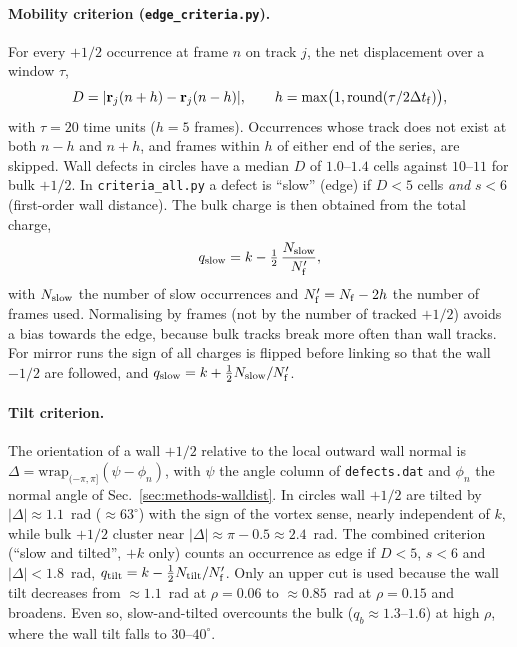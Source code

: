 \paragraph{Mobility criterion (\texttt{edge\_criteria.py}).}
For every $+1/2$ occurrence at frame $n$ on track $j$, the net displacement over a window $\tau$,
\begin{equation}
  D = |\mathbf{r}_j(n+h)-\mathbf{r}_j(n-h)|,\qquad h=\max\!\big(1,\mathrm{round}(\tau/2\Delta t_{\rm f})\big),
\end{equation}
with $\tau=20$ time units ($h=5$ frames). Occurrences whose track does not exist at both $n-h$ and $n+h$,
and frames within $h$ of either end of the series, are skipped. Wall defects in circles have a median
$D$ of $1.0$--$1.4$ cells against $10$--$11$ for bulk $+1/2$.
In \texttt{criteria\_all.py} a defect is ``slow'' (edge) if $D<5$ cells \emph{and} $s<6$ (first-order
wall distance). The bulk charge is then obtained from the total charge,
\begin{equation}
  q_{\rm slow} = k - \tfrac12\,\frac{N_{\rm slow}}{N_{\rm f}'},
\end{equation}
with $N_{\rm slow}$ the number of slow occurrences and $N_{\rm f}'=N_{\rm f}-2h$ the number of frames
used. Normalising by frames (not by the number of tracked $+1/2$) avoids a bias towards the edge,
because bulk tracks break more often than wall tracks.
For mirror runs the sign of all charges is flipped before linking so that the wall $-1/2$ are followed,
and $q_{\rm slow}=k+\tfrac12 N_{\rm slow}/N_{\rm f}'$.

\paragraph{Tilt criterion.}
The orientation of a wall $+1/2$ relative to the local outward wall normal is
$\Delta=\mathrm{wrap}_{(-\pi,\pi]}(\psi-\phi_n)$, with $\psi$ the angle column of \texttt{defects.dat} and
$\phi_n$ the normal angle of Sec.~\ref{sec:methods-walldist}. In circles wall $+1/2$ are tilted by
$|\Delta|\approx1.1$~rad ($\approx63^\circ$) with the sign of the vortex sense, nearly independent of $k$,
while bulk $+1/2$ cluster near $|\Delta|\approx\pi-0.5\approx2.4$~rad. The combined criterion
(``slow and tilted'', $+k$ only) counts an occurrence as edge if $D<5$, $s<6$ and $|\Delta|<1.8$~rad,
$q_{\rm tilt}=k-\tfrac12 N_{\rm tilt}/N_{\rm f}'$. Only an upper cut is used because the wall tilt
decreases from $\approx1.1$~rad at $\rho=0.06$ to $\approx0.85$~rad at $\rho=0.15$ and broadens.
Even so, slow-and-tilted overcounts the bulk ($q_b\approx1.3$--$1.6$) at high $\rho$, where the wall tilt
falls to $30$--$40^\circ$.

